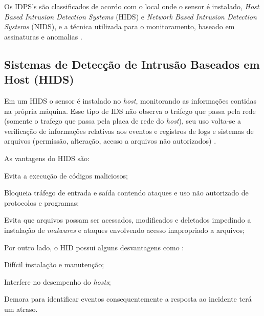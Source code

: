 Os IDPS's são classificados de acordo com o local onde o sensor é instalado, \textit{Host Based Intrusion Detection Systems} (HIDS) e \textit{Network Based Intrusion Detection Systems} (NIDS), e a técnica utilizada para o monitoramento, baseado em assinaturas e anomalias \cite{nagahama2012ipsflow}.

\subsection{Sistemas de Detecção de Intrusão Baseados em Host (HIDS)}

Em um HIDS o sensor é instalado no \textit{host}, monitorando as informações contidas na própria máquina. Esse tipo de IDS não observa o tráfego que passa pela rede (somente o trafego que passa pela placa de rede do \textit{host}), seu uso volta-se a verificação de informações relativas aos eventos e registros de logs e sistemas de arquivos (permissão, alteração, acesso a arquivos não autorizados) \cite{}.  

As vantagens do HIDS são: 

\begin{alineas}
\item Evita a execução de códigos maliciosos;
\item Bloqueia tráfego de entrada e saída contendo ataques e uso não autorizado de protocolos e programas;
\item Evita que arquivos possam ser acessados, modificados e deletados impedindo a instalação de \textit{malwares} e ataques envolvendo acesso inapropriado a arquivos;
\end{alineas}

Por outro lado, o HID possui alguns desvantagens como \cite{scarfone01}:  

\begin{alineas}
\item Difícil instalação e manutenção;
\item Interfere no desempenho do \textit{hosts};
\item Demora para identificar eventos consequentemente a resposta ao incidente terá um atraso.
\end{alineas}


